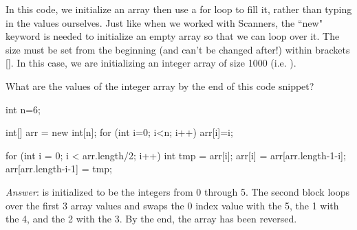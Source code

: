 In this code, we initialize an array then use a for loop to fill it, rather than typing in the values ourselves. Just like when we worked with Scanners, the ``new" keyword is needed to initialize an empty array so that we can loop over it. The size must be set from the beginning (and can't be changed after!) within brackets []. In this case, we are initializing an integer array of size 1000 (i.e. ). 

\begin{example}
What are the values of the integer array  by the end of this code snippet? 
\begin{code}
    int n=6;
    
    int[] arr = new int[n];
    for (int i=0; i<n; i++) {
      arr[i]=i;
    }

    for (int i = 0; i < arr.length/2; i++) {
      int tmp = arr[i];
      arr[i] = arr[arr.length-1-i];
      arr[arr.length-i-1] = tmp;
    }
\end{code}

\noindent \emph{Answer}:
 is initialized to be the integers from 0 through 5. The second block loops over the first 3 array values and swaps the 0 index value with the 5, the 1 with the 4, and the 2 with the 3. By the end, the array has been reversed.

\end{example}







